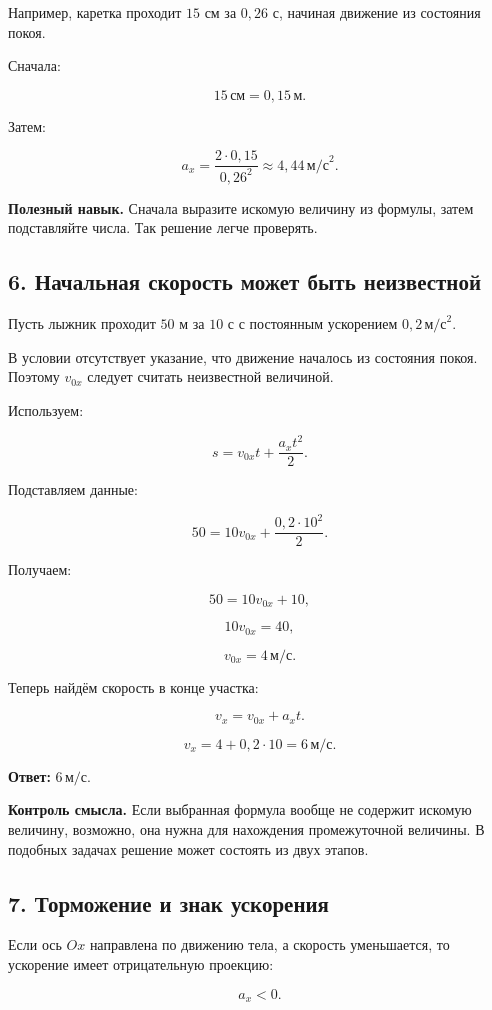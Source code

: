 \documentclass[a4paper,12pt]{article}
\newcommand{\ms}{\,\text{м/с}}
\newcommand{\mss}{\,\text{м/с}^2}
\newcommand{\important}[1]{\textcolor{darkaccent}{\textbf{#1}}}
\begin{document}
Например, каретка проходит $15$ см за $0{,}26$ с,
начиная движение из состояния покоя.

Сначала:

\[
15\,\text{см}=0{,}15\,\text{м}.
\]

Затем:

\[
a_x=
\frac{2\cdot0{,}15}{0{,}26^2}
\approx
4{,}44\mss.
\]

\important{Полезный навык.}
Сначала выразите искомую величину из формулы,
затем подставляйте числа.
Так решение легче проверять.

\subsection*{6. Начальная скорость может быть неизвестной}

Пусть лыжник проходит $50$ м за $10$ с
с постоянным ускорением $0{,}2\mss$.

В условии отсутствует указание,
что движение началось из состояния покоя.
Поэтому $v_{0x}$ следует считать неизвестной величиной.

Используем:

\[
s=v_{0x}t+\frac{a_xt^2}{2}.
\]

Подставляем данные:

\[
50
=
10v_{0x}
+
\frac{0{,}2\cdot10^2}{2}.
\]

Получаем:

\[
50=10v_{0x}+10,
\]

\[
10v_{0x}=40,
\]

\[
v_{0x}=4\ms.
\]

Теперь найдём скорость в конце участка:

\[
v_x=v_{0x}+a_xt.
\]

\[
v_x
=
4+0{,}2\cdot10
=
6\ms.
\]

\textbf{Ответ:}
$6\ms$.

\important{Контроль смысла.}
Если выбранная формула вообще не содержит искомую величину,
возможно, она нужна для нахождения промежуточной величины.
В подобных задачах решение может состоять из двух этапов.

\subsection*{7. Торможение и знак ускорения}

Если ось $Ox$ направлена по движению тела,
а скорость уменьшается, то ускорение имеет отрицательную проекцию:

\[
a_x<0.
\]
\end{document}
